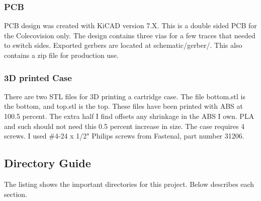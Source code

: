 \documentclass{article}
\begin{document}
  \subsubsection{PCB}

  \par
  PCB design was created with KiCAD version 7.X. This is a double sided PCB for the Colecovision only. The
  design contains three vias for a few traces that needed to switch sides. Exported gerbers are located at
  schematic/gerber/. This also contains a zip file for production use.

  \subsubsection{3D printed Case}

  \par
  There are two STL files for 3D printing a cartridge case. The file bottom.stl is the bottom, and top.stl is the top.
  These files have been printed with ABS at 100.5 percent. The extra half I find offsets any shrinkage in the ABS I own.
  PLA and such should not need this 0.5 percent increase in size. The case requires 4 screws. I used \#4-24 x 1/2"
  Philips screws from Fastenal, part number 31206.

  \subsection{Directory Guide}


  \vspace{\baselineskip}

  \par
  The listing shows the important directories for this project. Below describes each section.
\end{document}
